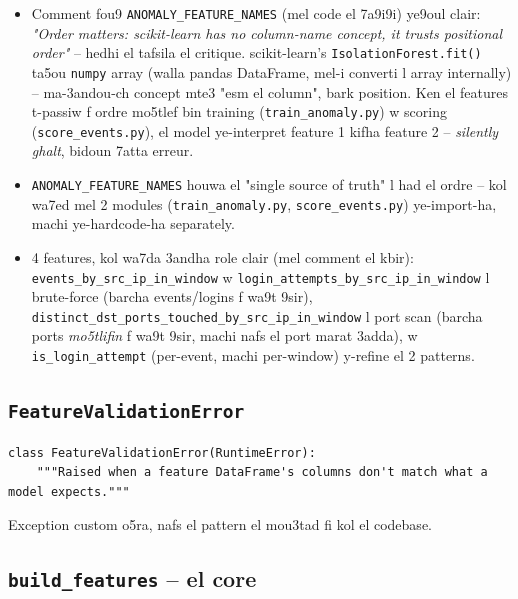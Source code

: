 \documentclass[11pt,a4paper]{report}
\DeclareRobustCommand{\code}[1]{\texttt{#1}}
\begin{document}
\begin{itemize}
  \item Comment fou9 \code{ANOMALY\_FEATURE\_NAMES} (mel code el 7a9i9i)
        ye9oul clair: \emph{"Order matters: scikit-learn has no
        column-name concept, it trusts positional order"} -- hedhi el
        tafsila el critique. scikit-learn's \code{IsolationForest.fit()}
        ta5ou \code{numpy} array (walla pandas DataFrame, mel-i converti
        l array internally) -- ma-3andou-ch concept mte3 "esm el column",
        bark position. Ken el features t-passiw f ordre mo5tlef bin
        training (\code{train\_anomaly.py}) w scoring
        (\code{score\_events.py}), el model ye-interpret feature 1 kifha
        feature 2 -- \emph{silently ghalt}, bidoun 7atta erreur.
  \item \code{ANOMALY\_FEATURE\_NAMES} houwa el "single source of truth"
        l had el ordre -- kol wa7ed mel 2 modules (\code{train\_anomaly.py},
        \code{score\_events.py}) ye-import-ha, machi ye-hardcode-ha
        separately.
  \item 4 features, kol wa7da 3andha role clair (mel comment el kbir):
        \code{events\_by\_src\_ip\_in\_window} w
        \code{login\_attempts\_by\_src\_ip\_in\_window} l brute-force
        (barcha events/logins f wa9t 9sir), \code{distinct\_dst\_ports\_touched\_by\_src\_ip\_in\_window}
        l port scan (barcha ports \emph{mo5tlifin} f wa9t 9sir, machi
        nafs el port marat 3adda), w \code{is\_login\_attempt}
        (per-event, machi per-window) y-refine el 2 patterns.
\end{itemize}

\subsection{\code{FeatureValidationError}}

\begin{lstlisting}[style=pystyle]
class FeatureValidationError(RuntimeError):
    """Raised when a feature DataFrame's columns don't match what a model expects."""
\end{lstlisting}

Exception custom o5ra, nafs el pattern el mou3tad fi kol el codebase.

\subsection{\code{build\_features} -- el core}
\end{document}
